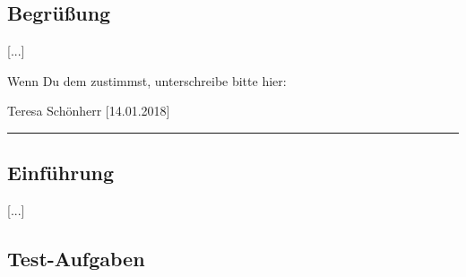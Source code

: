\subsection*{Begrüßung}
[...]

Wenn Du dem zustimmst, unterschreibe bitte hier:

\vspace*{1em}
Teresa Schönherr [14.01.2018]\vspace*{-.9em}\\
\noindent\rule{8cm}{0.4pt}

\subsection*{Einführung}
[...]


\subsection*{Test-Aufgaben}
